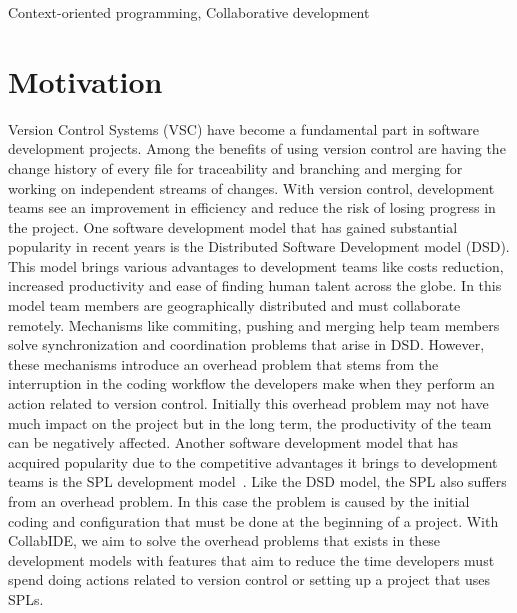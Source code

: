 \documentclass[10pt, conference]{IEEEtran}
\begin{document}
%
%
\begin{IEEEkeywords}
Context-oriented programming, Collaborative development
\end{IEEEkeywords}


\IEEEpeerreviewmaketitle


\section{Motivation}
\label{sec:motivation}

Version Control Systems (VSC) have become a fundamental part in software development projects. 
Among the benefits of using version control are having the change history of every file for traceability 
and branching and merging for working on independent streams of changes. With version control, 
development teams see an improvement in efficiency and reduce the risk of losing progress in the 
project.
One software development model that has gained substantial popularity in recent years is the 
Distributed Software Development model (DSD). This model brings various advantages to 
development teams like costs reduction, increased productivity and ease of finding human talent 
across the globe. In this model team members are geographically distributed and must collaborate 
remotely. Mechanisms like commiting, pushing and merging help team members solve synchronization 
and coordination problems that arise in DSD. However, these mechanisms introduce an overhead 
problem that stems from the interruption in the coding workflow the developers make when they 
perform an action related to version control. Initially this overhead problem may not have much impact 
on the project but in the long term, the productivity of the team can be negatively affected.
Another software development model that has acquired popularity due to the competitive advantages 
it brings to development teams is the \ac{SPL} development model~\cite{pohl+05sple}. Like the DSD 
model, the SPL also suffers from an overhead problem. In this case the problem is caused by the initial 
coding and configuration that must be done at the beginning of a project.
With CollabIDE, we aim to solve the overhead problems that exists in these development models with 
features that aim to reduce the time developers must spend doing actions related to version control or 
setting up a project that uses \acp{SPL}.
\end{document}
